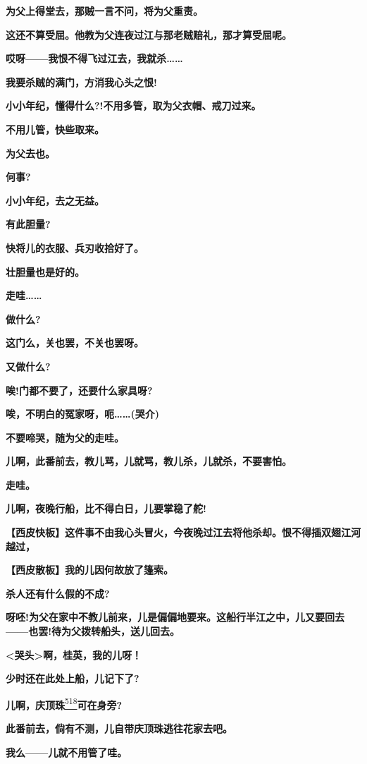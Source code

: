 \textbf{为父上得堂去，那贼一言不问，将为父重责。}

\textbf{这还不算受屈。他教为父连夜过江与那老贼赔礼，那才算受屈呢。}

\textbf{哎呀------我恨不得飞过江去，我就杀\ldots{}\ldots{}}

\textbf{我要杀贼的满门，方消我心头之恨!}

\textbf{小小年纪，懂得什么?!不用多管，取为父衣帽、戒刀过来。}

\textbf{不用儿管，快些取来。}

\textbf{为父去也。}

\textbf{何事?}

\textbf{小小年纪，去之无益。}

\textbf{有此胆量?}

\textbf{快将儿的衣服、兵刃收拾好了。}

\textbf{壮胆量也是好的。}

\textbf{走哇\ldots{}\ldots{}}

\textbf{做什么?}

\textbf{这门么，关也罢，不关也罢呀。}

\textbf{又做什么?}

\textbf{唉!门都不要了，还要什么家具呀?}

\textbf{唉，不明白的冤家呀，呃\ldots{}\ldots{}(哭介)}

\textbf{不要啼哭，随为父的走哇。}

\textbf{儿啊，此番前去，教儿骂，儿就骂，教儿杀，儿就杀，不要害怕。}

\textbf{走哇。}

\textbf{儿啊，夜晚行船，比不得白日，儿要掌稳了舵!}

\textbf{【西皮快板】这件事不由我心头冒火，今夜晚过江去将他杀却。恨不得插双翅江河越过，}

\textbf{【西皮散板】我的儿因何故放了篷索。}

\textbf{杀人还有什么假的不成?}

\textbf{呀呸!为父在家中不教儿前来，儿是偏偏地要来。这船行半江之中，儿又要回去------也罢!待为父拨转船头，送儿回去。}

\textbf{\textless{}哭头\textgreater{}啊，桂英，我的儿呀！}

\textbf{少时还在此处上船，儿记下了?}

\textbf{儿啊，庆顶珠}\protect\hyperlink{fn518}{\textsuperscript{518}}\textbf{可在身旁?}

\textbf{此番前去，倘有不测，儿自带庆顶珠逃往花家去吧。}

\textbf{我么------儿就不用管了哇。}

